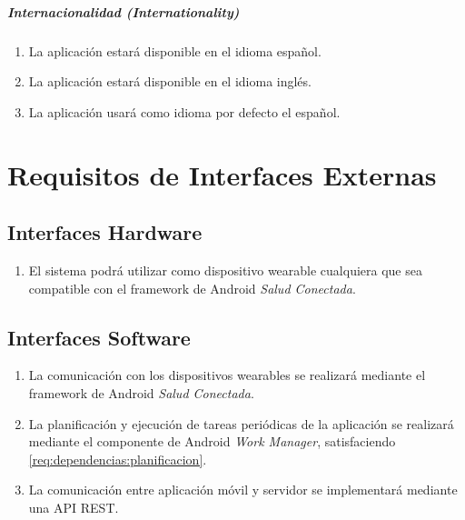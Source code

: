                 \subparagraph{Internacionalidad (Internationality)}
                    \begin{enumerate}[resume, label=\textbf{\texttt{RNF-\arabic*}}]
                        \item La aplicación estará disponible en el idioma español.
                        \item La aplicación estará disponible en el idioma inglés.
                        \item La aplicación usará como idioma por defecto el español.
                    \end{enumerate}
\section{Requisitos de Interfaces Externas}
    \label{req:externas}

    \subsection{Interfaces Hardware}
        \label{req:externas:hardware}

        \begin{enumerate}[label=\textbf{\texttt{RIS-\arabic*}}]
            \item El sistema podrá utilizar como dispositivo \gls{wearable} cualquiera que sea compatible con el \gls{framework} de Android \textit{Salud Conectada}.
        \end{enumerate}
    
    \subsection{Interfaces Software}
        \label{req:externas:software}
        \begin{enumerate}[label=\textbf{\texttt{RIS-\arabic*}}]
            \item La comunicación con los dispositivos \glspl{wearable} se realizará mediante el \gls{framework} de Android \textit{Salud Conectada}.
            \item La planificación y ejecución de tareas periódicas de la aplicación se realizará mediante el componente de Android \textit{Work Manager}, satisfaciendo \ref{req:dependencias:planificacion}.
            \item \label{req:externas:api} La comunicación entre aplicación móvil y servidor se implementará mediante una API REST.
        \end{enumerate}
